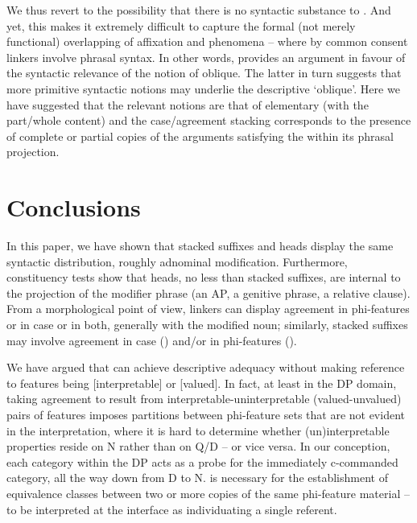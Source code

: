\documentclass[output=paper]{langsci/langscibook}
\begin{document}
We thus revert to the possibility that there is no syntactic substance to . And yet, this makes it extremely difficult to capture the formal (not merely functional) overlapping of affixation and  phenomena – where by common consent linkers involve phrasal syntax. In other words,  provides an argument in favour of the syntactic relevance of the notion of oblique. The latter in turn suggests that more primitive syntactic notions may underlie the descriptive ‘oblique’. Here we have suggested that the relevant notions are that of elementary  (with the part\slash whole content) and the case\slash agreement stacking corresponds to the presence of complete or partial copies of the arguments satisfying the  within its phrasal projection. 

\section{Conclusions}%

In this paper, we have shown that stacked suffixes and  heads display the same syntactic distribution, roughly adnominal modification. Furthermore, constituency tests show that  heads, no less than stacked suffixes, are internal to the projection of the modifier phrase (an AP, a genitive phrase, a relative clause). From a morphological point of view, linkers can display agreement in phi-features or in case or in both, generally with the modified noun; similarly, stacked suffixes may involve agreement in case () and\slash or in phi-features (). 

  We have argued that  can achieve descriptive adequacy without making reference to features being [interpretable] or [valued]. In fact, at least in the DP domain, taking agreement to result from interpretable-uninterpretable (valued-unvalued) pairs of features imposes partitions between phi-feature sets that are not evident in the interpretation, where it is hard to determine whether (un)interpretable properties reside on N rather than on Q\slash D – or vice versa. In our conception, each category within the DP acts as a probe for the immediately c-commanded category, all the way down from D to N.  is necessary for the establishment of equivalence classes between two or more copies of the same phi-feature material – to be interpreted at the interface as individuating a single referent. 
\end{document}
